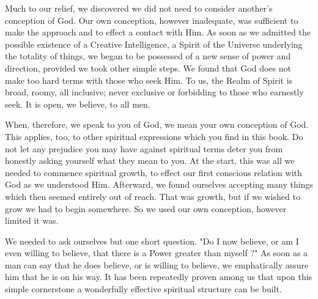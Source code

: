 \begin{biblechapter}
    Much to our relief, we discovered we did not need to consider another's conception of God. 
Our own conception, however inadequate, 
was sufficient to make the approach and to effect a contact with Him. 
As soon as we admitted the possible existence of a Creative Intelligence, 
a Spirit of the Universe underlying the totality of things, 
we began to be possessed of a new sense of power and direction, 
provided we took other simple steps. 
We found that God does not make too hard terms with those who seek Him. 
To us, the Realm of Spirit is broad, roomy, all inclusive; 
never exclusive or forbidding to those who earnestly seek. 
It is open, we believe, to all men.

When, therefore, we speak to you of God, we mean your own conception of God. 
This applies, too, to other spiritual expressions which you find in this book. 
Do not let any prejudice you may have against spiritual terms 
deter you from honestly asking yourself what they mean to you. 
At the start, this was all we needed to commence spiritual growth, 
to effect our first conscious relation with God as we understood Him. 
Afterward, we found ourselves accepting many things which then seemed entirely out of reach. 
That was growth, but if we wished to grow we had to begin somewhere. 
So we used our own conception, however limited it was.

We needed to ask ourselves but one short question. 
"Do I now believe, 
or am I even willing to believe, 
that there is a Power greater than myself ?" 
As soon as a man can say that he does believe, 
or is willing to believe, 
we emphatically assure him that he is on his way. 
It has been repeatedly proven among us that upon this simple cornerstone 
a wonderfully effective spiritual structure can be built.
\end{biblechapter}


